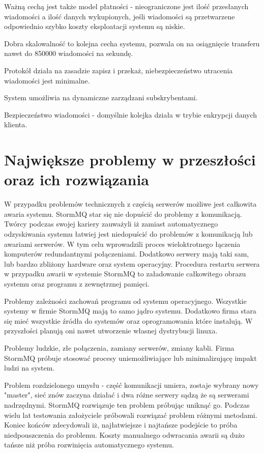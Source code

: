 \documentclass[paper=a4, fontsize=11pt]{scrartcl} %
\numberwithin{equation}{section} %
\numberwithin{figure}{section} %
\numberwithin{table}{section} %
\begin{document}
Ważną cechą jest także model płatności - nieograniczone jest ilość przesłanych wiadomości a ilość
danych wykupionych, jeśli wiadomości są przetwarzene odpowiednio szybko koszty eksploatacji systemu
są niskie.

Dobra skalowalność to kolejna cecha systemu, pozwala on na osiągnięcie transferu nawet do 850000 wiadomości
na sekundę.

Protokół działa na zasadzie zapisz i przekaż, niebezpieczeństwo utracenia wiadomości jest minimalne.

System umożliwia na dynamiczne zarządzani subskrybentami.

Bezpieczeństwo wiadomości - domyślnie kolejka działa w trybie enkrypcji danych klienta.

\section{Największe problemy w przeszłości oraz ich rozwiązania}

W przypadku problemów technicznych z częścią serwerów możliwe jest całkowita
awaria systemu. StormMQ star się nie dopuścić do problemy z komunikacją. Twórcy
podczas swojej kariery zauważyli iż zamiast automatycznego odzyskiwania systemu
łatwiej jest niedopuścić do problemów z  komunikacją lub awariami serwerów.
W tym celu wprowadzili proces wieloktrotnego łączenia komputerów redundantnymi połączeniami.
Dodatkowo serwery mają taki sam, lub bardzo zbliżony hardware oraz system operacyjny.
Procedura restartu serwera w przypadku awarii w systemie StormMQ to załadowanie całkowitego
obrazu systemu oraz programu z zewnętrznej pamięci.

Problemy zależności zachowań programu od systemu operacyjnego. Wszystkie systemy w firmie
StormMQ mają to samo jądro systemu. Dodatkowo firma stara się mieć wszystkie źródła do systemów oraz
oprogramowania które instalują. W przyszłości planują oni nawet utworzenie własnej dystrybucji linuxa.

Problemy ludzkie, złe połączenia, zamiany serwerów, zmiany kabli. Firma StormMQ próbuje stosować procesy
uniemożliwiające lub minimalizującę impakt ludzi na system.

Problem rozdzielonego umysłu - część komunikacji umiera, zostaje wybrany nowy "master", sieć znów zaczyna działać
i dwa różne serwery sądzą że są serwerami nadrzędnymi. StormMQ rozwiązuje ten problem próbując uniknąć go. Podczas
wielu lat testowania założyciele próbowali rozwiązać problem różnymi metodami. Koniec końców zdecydowali iż, najłatwiejsze
i najtańsze podejście to próba niedpouszczenia do problemu. Koszty manualnego odwracania awarii są dużo tańsze niż próba
rozwinięcia automatycznego systemu.
\end{document}
